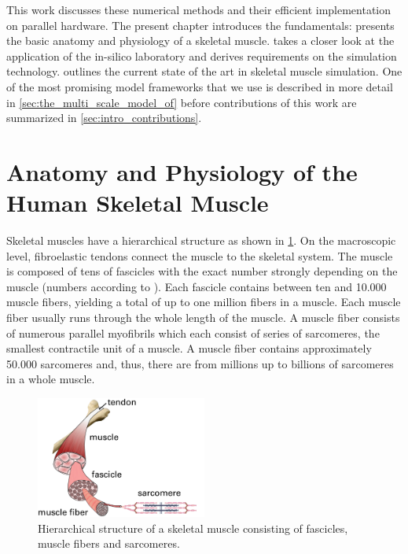 This work discusses these numerical methods and their efficient implementation on parallel hardware. The present chapter introduces the fundamentals:
 presents the basic anatomy and physiology of a skeletal muscle.
 takes a closer look at the application of the in-silico laboratory and derives requirements on the simulation technology. 
 outlines the current state of the art in skeletal muscle simulation. One of the most promising model frameworks that we use is described in more detail in \cref{sec:the_multi_scale_model_of} before contributions of this work are summarized in \cref{sec:intro_contributions}.

\section{Anatomy and Physiology of the Human Skeletal Muscle}\label{sec:anatomy_physiology}

Skeletal muscles have a hierarchical structure as shown in \cref{fig:hierarchical_structure}. On the macroscopic level, fibroelastic tendons connect the muscle to the skeletal system. The muscle is composed of tens of fascicles with the exact number strongly depending on the muscle (numbers according to \cite{MacIntosh2006}). Each fascicle contains between ten and 10.000 muscle fibers, yielding a total of up to one million fibers in a muscle. Each muscle fiber usually runs through the whole length of the muscle. A muscle fiber consists of numerous parallel myofibrils which each consist of series of sarcomeres, the smallest contractile unit of a muscle. A muscle fiber contains approximately 50.000 sarcomeres and, thus, there are from millions up to billions of sarcomeres in a whole muscle.

\begin{figure}
  \centering%
  \includegraphics[width=0.5\textwidth]{images/introduction/hierarchical_structure.pdf}%
  \caption{Hierarchical structure of a skeletal muscle consisting of fascicles, muscle fibers and sarcomeres.}%
  \label{fig:hierarchical_structure}%
\end{figure}%


